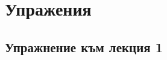 \documentclass[a4paper,fleqn,12pt]{article}
\begin{document}
\newpage




























































\section{Упражения}

\subsection{Упражнение към лекция 1}
\end{document}
